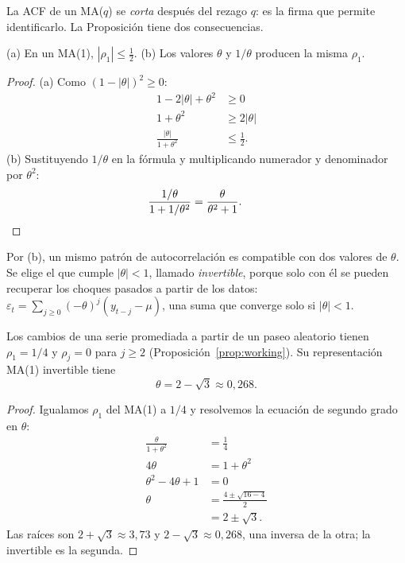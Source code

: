 La ACF de un MA($q$) se \emph{corta} después del rezago $q$: es la firma que permite identificarlo. La
Proposición tiene dos consecuencias.

\begin{corolario}\label{cor:ma1cota}
(a) En un MA(1), $|\rho_1|\le\tfrac12$. (b) Los valores $\theta$ y $1/\theta$ producen la misma $\rho_1$.
\end{corolario}

\begin{proof}
(a) Como $(1-|\theta|)^2\ge0$:
\begin{align*}
  1-2|\theta|+\theta^2 &\ge 0\\
  1+\theta^2           &\ge 2|\theta|\\
  \frac{|\theta|}{1+\theta^2} &\le \frac12 .
\end{align*}
(b) Sustituyendo $1/\theta$ en la fórmula y multiplicando numerador y denominador por $\theta^2$:
\begin{align*}
  \frac{1/\theta}{1+1/\theta^2} &= \frac{\theta}{\theta^2+1}. && \qedhere
\end{align*}
\end{proof}

Por (b), un mismo patrón de autocorrelación es compatible con dos valores de $\theta$. Se elige el que cumple
$|\theta|<1$, llamado \emph{invertible}, porque solo con él se pueden recuperar los choques pasados a partir de
los datos: $\varepsilon_t=\sum_{j\ge0}(-\theta)^j(y_{t-j}-\mu)$, una suma que converge solo si $|\theta|<1$.

\begin{proposicion}\label{prop:workingma}
Los cambios de una serie promediada a partir de un paseo aleatorio tienen $\rho_1=1/4$ y $\rho_j=0$ para
$j\ge2$ (Proposición~\ref{prop:working}). Su representación MA(1) invertible tiene
\[
  \theta=2-\sqrt3\approx0{,}268 .
\]
\end{proposicion}

\begin{proof}
Igualamos $\rho_1$ del MA(1) a $1/4$ y resolvemos la ecuación de segundo grado en $\theta$:
\begin{align*}
  \frac{\theta}{1+\theta^2} &= \frac14\\
  4\theta                   &= 1+\theta^2\\
  \theta^2-4\theta+1        &= 0\\
  \theta                    &= \frac{4\pm\sqrt{16-4}}{2}\\
                            &= 2\pm\sqrt3 .
\end{align*}
Las raíces son $2+\sqrt3\approx3{,}73$ y $2-\sqrt3\approx0{,}268$, una inversa de la otra; la invertible es la
segunda.
\end{proof}

